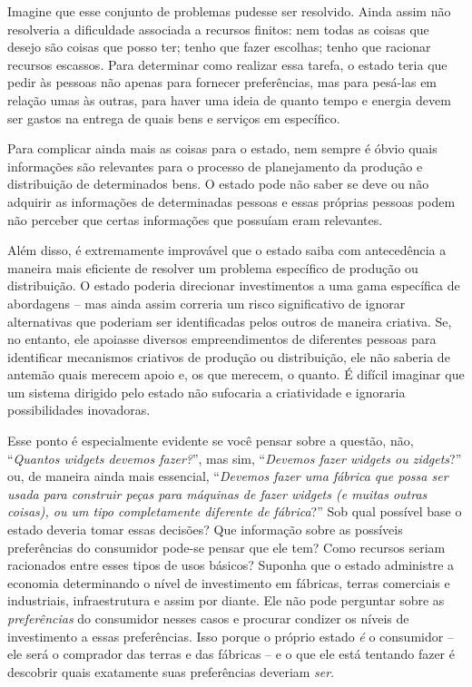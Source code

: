 Imagine que esse conjunto de problemas pudesse ser resolvido. Ainda assim não resolveria a dificuldade associada a recursos finitos: nem todas as coisas que desejo são coisas que posso ter; tenho que fazer escolhas; tenho que racionar recursos escassos. Para determinar como realizar essa tarefa, o estado teria que pedir às pessoas não apenas para fornecer preferências, mas para pesá-las em relação umas às outras, para haver uma ideia de quanto tempo e energia devem ser gastos na entrega de quais bens e serviços em específico.

Para complicar ainda mais as coisas para o estado, nem sempre é óbvio quais informações são relevantes para o processo de planejamento da produção e distribuição de determinados bens. O estado pode não saber se deve ou não adquirir as informações de determinadas pessoas e essas próprias pessoas podem não perceber que certas informações que possuíam eram relevantes.

Além disso, é extremamente improvável que o estado saiba com antecedência a maneira mais eficiente de resolver um problema específico de produção ou distribuição. O estado poderia direcionar investimentos a uma gama específica de abordagens -- mas ainda assim correria um risco significativo de ignorar alternativas que poderiam ser identificadas pelos outros de maneira criativa. Se, no entanto, ele apoiasse diversos empreendimentos de diferentes pessoas para identificar mecanismos criativos de produção ou distribuição, ele não saberia de antemão quais merecem apoio e, os que merecem, o quanto. É difícil imaginar que um sistema dirigido pelo estado não sufocaria a criatividade e ignoraria possibilidades inovadoras.

Esse ponto é especialmente evidente se você pensar sobre a questão, não, ``\emph{Quantos widgets devemos fazer?}'', mas sim, ``\emph{Devemos fazer widgets ou zidgets}?'' ou, de maneira ainda mais essencial, ``\emph{Devemos fazer uma fábrica que possa ser usada para construir peças para máquinas de fazer widgets (e muitas outras coisas), ou um tipo completamente diferente de fábrica}?'' Sob qual possível base o estado deveria tomar essas decisões? Que informação sobre as possíveis preferências do consumidor pode-se pensar que ele tem? Como recursos seriam racionados entre esses tipos de usos básicos? Suponha que o estado administre a economia determinando o nível de investimento em fábricas, terras comerciais e industriais, infraestrutura e assim por diante. Ele não pode perguntar sobre as \emph{preferências} do consumidor nesses casos e procurar condizer os níveis de investimento a essas preferências. Isso porque o próprio estado \emph{é} o consumidor -- ele será o comprador das terras e das fábricas -- e o que ele está tentando fazer é descobrir quais exatamente suas preferências deveriam \emph{ser}.

